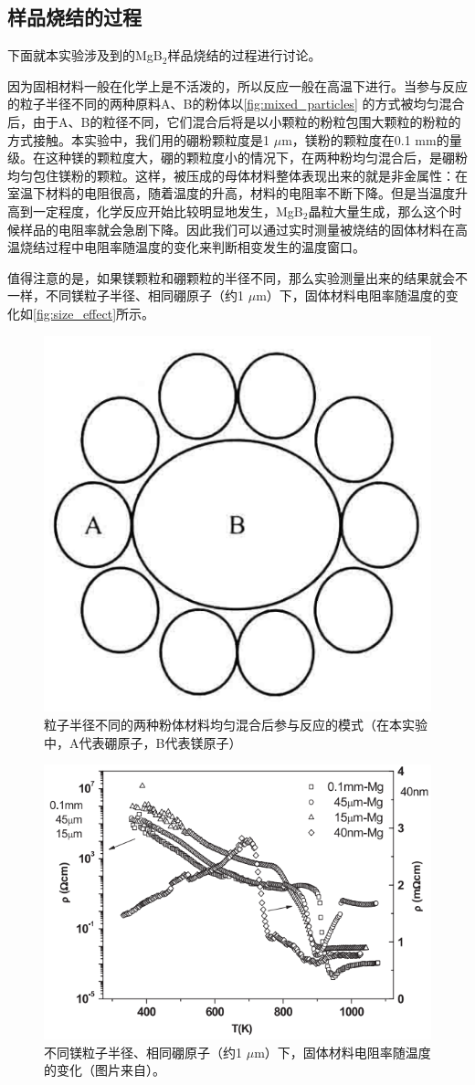 \documentclass[font=default]{mpltx}
\begin{document}
\subsection{样品烧结的过程}
下面就本实验涉及到的MgB$_2$样品烧结的过程进行讨论。

因为固相材料一般在化学上是不活泼的，所以反应一般在高温下进行。当参与反应的粒子半径不同的两种原料A、B的粉体以\autoref{fig:mixed_particles} 的方式被均匀混合后，由于A、B的粒径不同，它们混合后将是以小颗粒的粉粒包围大颗粒的粉粒的方式接触。本实验中，我们用的硼粉颗粒度是1 $\mu$m，镁粉的颗粒度在0.1 mm的量级。在这种镁的颗粒度大，硼的颗粒度小的情况下，在两种粉均匀混合后，是硼粉均匀包住镁粉的颗粒。这样，被压成的母体材料整体表现出来的就是非金属性：在室温下材料的电阻很高，随着温度的升高，材料的电阻率不断下降。但是当温度升高到一定程度，化学反应开始比较明显地发生，MgB$_2$晶粒大量生成，那么这个时候样品的电阻率就会急剧下降。因此我们可以通过实时测量被烧结的固体材料在高温烧结过程中电阻率随温度的变化来判断相变发生的温度窗口。

值得注意的是，如果镁颗粒和硼颗粒的半径不同，那么实验测量出来的结果就会不一样，不同镁粒子半径、相同硼原子（约1 $\mu$m）下，固体材料电阻率随温度的变化如\autoref{fig:size_effect}所示。
\begin{figure}[h]
  \centering
  \includegraphics[width=0.25\linewidth]{fig/mixed_particles.png}
  \caption{粒子半径不同的两种粉体材料均匀混合后参与反应的模式（在本实验中，A代表硼原子，B代表镁原子）}
  \label{fig:mixed_particles}
\end{figure}

\begin{figure}[h]
  \centering
  \includegraphics[width=0.55\linewidth]{fig/size_effect.png}
  \caption{不同镁粒子半径、相同硼原子（约1 $\mu$m）下，固体材料电阻率随温度的变化（图片来自\cite{Zhuang}）。}
  \label{fig:size_effect}
\end{figure}
\end{document}
